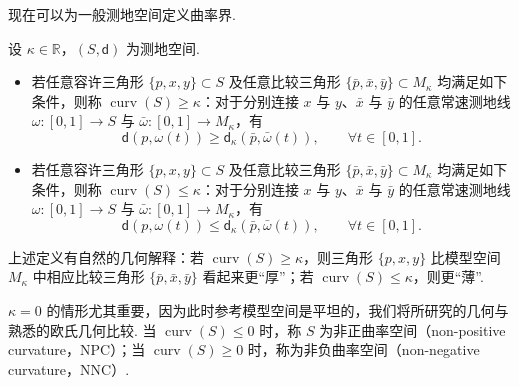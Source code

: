 现在可以为一般测地空间定义曲率界.
\begin{definition}\label{def:7.9}
设 $\kappa\in\mathbb R$，$(S,\mathsf d)$ 为测地空间.
\begin{itemize}
\item 若任意容许三角形 $\{p,x,y\}\subset S$ 及任意比较三角形 $\{\bar p,\bar x,\bar y\}\subset M_\kappa$ 均满足如下条件，则称 $\operatorname{curv}(S)\ge\kappa$：对于分别连接 $x$ 与 $y$、$\bar x$ 与 $\bar y$ 的任意常速测地线 $\omega:[0,1]\to S$ 与 $\bar\omega:[0,1]\to M_\kappa$，有
\begin{equation}\label{eq:7.8}
\mathsf d(p,\omega(t))\ge\mathsf d_\kappa(\bar p,\bar\omega(t)),\qquad\forall t\in[0,1].
\end{equation}
\item 若任意容许三角形 $\{p,x,y\}\subset S$ 及任意比较三角形 $\{\bar p,\bar x,\bar y\}\subset M_\kappa$ 均满足如下条件，则称 $\operatorname{curv}(S)\le\kappa$：对于分别连接 $x$ 与 $y$、$\bar x$ 与 $\bar y$ 的任意常速测地线 $\omega:[0,1]\to S$ 与 $\bar\omega:[0,1]\to M_\kappa$，有
\begin{equation}\label{eq:7.9}
\mathsf d(p,\omega(t))\le\mathsf d_\kappa(\bar p,\bar\omega(t)),\qquad\forall t\in[0,1].
\end{equation}
\end{itemize}
\end{definition}
上述定义有自然的几何解释：若 $\operatorname{curv}(S)\ge\kappa$，则三角形 $\{p,x,y\}$ 比模型空间 $M_\kappa$ 中相应比较三角形 $\{\bar p,\bar x,\bar y\}$ 看起来更“厚”；若 $\operatorname{curv}(S)\le\kappa$，则更“薄”.

$\kappa=0$ 的情形尤其重要，因为此时参考模型空间是平坦的，我们将所研究的几何与熟悉的欧氏几何比较. 当 $\operatorname{curv}(S)\le0$ 时，称 $S$ 为非正曲率空间（non-positive curvature，NPC）；当 $\operatorname{curv}(S)\ge0$ 时，称为非负曲率空间（non-negative curvature，NNC）.

